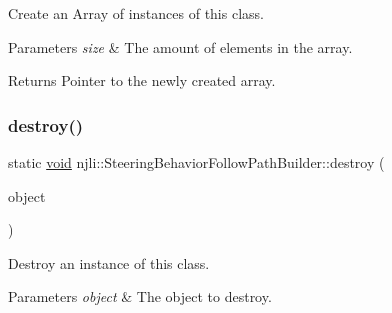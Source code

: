 Create an Array of instances of this class.


\begin{DoxyParams}{Parameters}
{\em size} & The amount of elements in the array.\\
\hline
\end{DoxyParams}
\begin{DoxyReturn}{Returns}
Pointer to the newly created array. 
\end{DoxyReturn}
\mbox{\label{classnjli_1_1_steering_behavior_follow_path_builder_a9a44746973699b2b239d830111d45f58}} 
\subsubsection{\texorpdfstring{destroy()}{destroy()}}
{\footnotesize\ttfamily static \mbox{\hyperlink{_thread_8h_af1e856da2e658414cb2456cb6f7ebc66}{void}} njli\+::\+Steering\+Behavior\+Follow\+Path\+Builder\+::destroy (\begin{DoxyParamCaption}\item[{\mbox{\hyperlink{classnjli_1_1_steering_behavior_follow_path_builder}{Steering\+Behavior\+Follow\+Path\+Builder}} $\ast$}]{object }\end{DoxyParamCaption})\hspace{0.3cm}{\ttfamily [static]}}

Destroy an instance of this class.


\begin{DoxyParams}{Parameters}
{\em object} & The object to destroy. \\
\hline
\end{DoxyParams}
\mbox{\label{classnjli_1_1_steering_behavior_follow_path_builder_af65a2e1a8ad421ea99bf55b4dd1087de}} 
